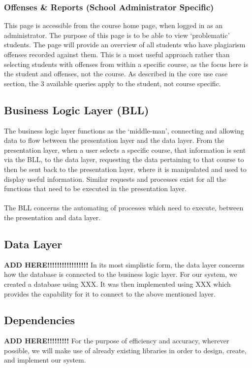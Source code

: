 \documentclass[paper=a4, fontsize=11pt]{scrartcl}
\numberwithin{equation}{section}		%
\numberwithin{figure}{section}			%
\numberwithin{table}{section}				%
\begin{document}
\subsubsection{Offenses \& Reports (School Administrator Specific)}
This page is accessible from the course home page, when logged in as an administrator. The purpose of this page is to be able to view ‘problematic’ students. The page will provide an overview of all students who have plagiarism offenses recorded against them. This is a most useful approach rather than selecting students with offenses from within a specific course, as the focus here is the student and offenses, not the course.  As described in the core use case section, the 3 available queries apply to the student, not course specific.


\subsection{Business Logic Layer (BLL)}
The business logic layer functions as the ‘middle-man’, connecting and allowing data to flow between the presentation layer  and the data layer. From the presentation layer, when a user selects a specific course, that information is sent via the BLL, to the data layer, requesting the data pertaining to that course to then be sent back to the presentation layer, where it is manipulated and used to display useful information. Similar requests and processes exist for all the functions that need to be executed in the presentation layer. \\\\The BLL concerns the automating of processes which need to execute, between the presentation and data layer.


\subsection{Data Layer}
\huge\textbf{ADD HERE!!!!!!!!!!!!!!!!!}\normalsize
In its most simplistic form, the data layer concerns how the database is connected to the business logic layer. For our system, we created a database using XXX. It was then implemented using XXX which provides the capability for it to connect to the above mentioned layer.     

\subsection{Dependencies}
\huge\textbf{ADD HERE!!!!!!!!!}\normalsize
For the purpose of efficiency and accuracy, wherever possible, we will make use of already existing libraries in order to design, create, and implement our system.
\end{document}
